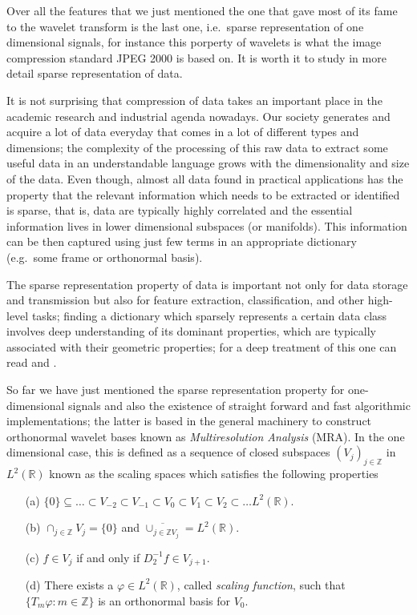 \bigskip

Over all the features that we just mentioned the one that gave most of its fame to the wavelet transform is the last one, i.e.\ sparse representation of one dimensional signals, for instance this porperty of wavelets is what the image compression standard JPEG 2000 is based on. It is worth it to study in more detail sparse representation of data.

\bigskip

It is not surprising that compression of data takes an important place in the academic research and industrial agenda nowadays. Our society generates and acquire a lot of data everyday that comes in a lot of different types and dimensions; the complexity of the processing of this raw data to extract some useful data in an understandable language grows with the dimensionality and size of the data. Even though, almost all data found in practical applications has the property that the relevant information which needs to be extracted or identified is sparse, that is, data are typically highly correlated and the essential information lives in lower dimensional subspaces (or manifolds). This information can be then captured using just few terms in an appropriate dictionary (e.g.\ some frame or orthonormal basis). 

\bigskip

The sparse representation property of data is important not only for data storage and transmission but also for feature extraction, classification, and other high-level tasks; finding a dictionary which sparsely represents a certain data class involves deep understanding of its dominant properties, which are typically associated with their geometric properties; for a deep treatment of this one can read \cite{IntroShearlets} and \cite{Gitta-Lim}.

\bigskip

So far we have just mentioned the sparse representation property for one-dimensional signals and also the existence of straight forward and fast algorithmic implementations; the latter is based in the general machinery to construct orthonormal wavelet bases known as \textit{Multiresolution Analysis} (MRA). In the one dimensional case, this is defined as a sequence of closed subspaces $(V_j)_{j\in\mathbb{Z}}$ in $L^2(\mathbb{R})$ known as the scaling spaces which satisfies the following properties

\begin{enumerate}
\item[(a)] $\{0\}\subseteq\ldots\subset V_{-2}\subset V_{-1}\subset V_0\subset V_1\subset V_2\subset\ldots L^2(\mathbb{R})$.
\item[(b)] $\cap_{j\in\mathbb{Z}}V_j=\{0\}$ and $\overline{\cup_{j\in\mathbb{Z}V_j}}=L^2(\mathbb{R})$.
\item[(c)] $f\in V_j$ if and only if $D_2^{-1}f\in V_{j+1}$.
\item[(d)] There exists a $\varphi\in L^2(\mathbb{R})$, called \textit{scaling function}, such that $\{T_m\varphi:m\in\mathbb{Z}\}$ is an orthonormal basis for $V_0$.
\end{enumerate}

